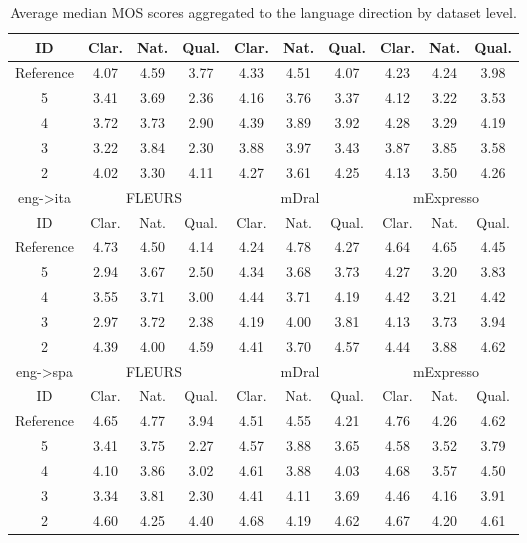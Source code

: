 \begin{table}[!ht]
\begin{tabular}{c|ccc|ccc|ccc}
\hline
ID & Clar. & Nat. & Qual. & Clar. & Nat. & Qual. & Clar. & Nat. & Qual. \\
\hline
Reference & 4.07 & 4.59 & 3.77 & 4.33 & 4.51 & 4.07 & 4.23 & 4.24 & 3.98\\
5 & 3.41 & 3.69 & 2.36 & 4.16 & 3.76 & 3.37 & 4.12 & 3.22 & 3.53\\
4 & 3.72 & 3.73 & 2.90 & 4.39 & 3.89 & 3.92 & 4.28 & 3.29 & 4.19\\
3 & 3.22 & 3.84 & 2.30 & 3.88 & 3.97 & 3.43 & 3.87 & 3.85 & 3.58\\
2 & 4.02 & 3.30 & 4.11 & 4.27 & 3.61 & 4.25 & 4.13 & 3.50 & 4.26\\
\hline
eng->ita & \multicolumn{3}{c|}{FLEURS} & \multicolumn{3}{c|}{mDral} & \multicolumn{3}{c|}{mExpresso}\\
\hline
ID & Clar. & Nat. & Qual. & Clar. & Nat. & Qual. & Clar. & Nat. & Qual. \\
\hline
Reference & 4.73 & 4.50 & 4.14 & 4.24 & 4.78 & 4.27 & 4.64 & 4.65 & 4.45\\
5 & 2.94 & 3.67 & 2.50 & 4.34 & 3.68 & 3.73 & 4.27 & 3.20 & 3.83\\
4 & 3.55 & 3.71 & 3.00 & 4.44 & 3.71 & 4.19 & 4.42 & 3.21 & 4.42\\
3 & 2.97 & 3.72 & 2.38 & 4.19 & 4.00 & 3.81 & 4.13 & 3.73 & 3.94\\
2 & 4.39 & 4.00 & 4.59 & 4.41 & 3.70 & 4.57 & 4.44 & 3.88 & 4.62\\
\hline
eng->spa & \multicolumn{3}{c|}{FLEURS} & \multicolumn{3}{c|}{mDral} & \multicolumn{3}{c|}{mExpresso}\\
\hline
ID & Clar. & Nat. & Qual. & Clar. & Nat. & Qual. & Clar. & Nat. & Qual. \\
\hline
Reference & 4.65 & 4.77 & 3.94 & 4.51 & 4.55 & 4.21 & 4.76 & 4.26 & 4.62\\
5 & 3.41 & 3.75 & 2.27 & 4.57 & 3.88 & 3.65 & 4.58 & 3.52 & 3.79\\
4 & 4.10 & 3.86 & 3.02 & 4.61 & 3.88 & 4.03 & 4.68 & 3.57 & 4.50\\
3 & 3.34 & 3.81 & 2.30 & 4.41 & 4.11 & 3.69 & 4.46 & 4.16 & 3.91\\
2 & 4.60 & 4.25 & 4.40 & 4.68 & 4.19 & 4.62 & 4.67 & 4.20 & 4.61\\
\hline
\end{tabular}
\caption{\label{tab:mos_human_evaluation_full_table_mu}Average median MOS scores aggregated to the language direction by dataset level.}
\end{table}

